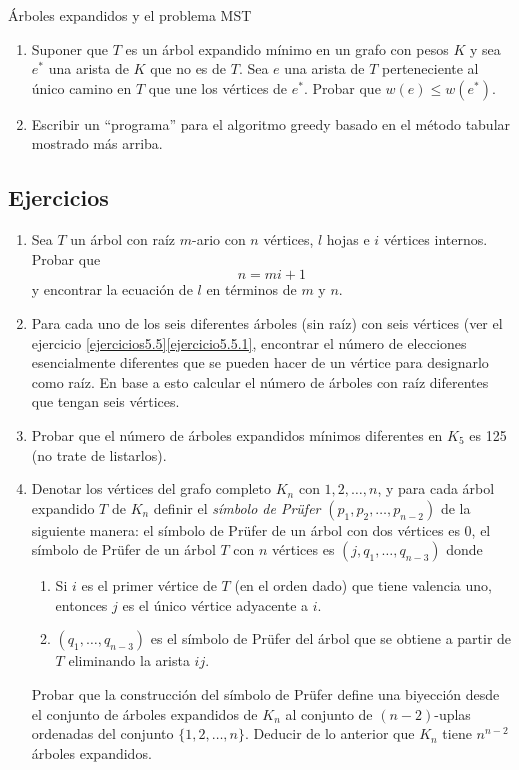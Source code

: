 \begin{section}{Árboles expandidos y el problema MST}
\begin{enumerate}
Encontrar todos los árboles expandidos mínimos para $G$.

\item Suponer que $T$ es un árbol expandido mínimo en un grafo con pesos $K$ y sea $e^*$ una arista de $K$ que no es de $T$. Sea $e$ una arista de $T$ perteneciente al único camino en $T$ que une los vértices de $e^*$. Probar que $w(e) \le w(e^*)$. 

\item Escribir un ``programa'' para el algoritmo greedy basado en el
método ta\-bu\-lar mostrado más arriba.
\end{enumerate}

\section{Ejercicios}
\begin{enumerate}
\item Sea $T$ un árbol con raíz $m$-ario con $n$ vértices, $l$ hojas e $i$ vértices internos. Probar que
$$ n=mi+1$$
y encontrar la ecuación de $l$ en términos de $m$ y $n$.

\item Para cada uno de los seis diferentes árboles (sin raíz) con seis vértices (ver el ejercicio \ref{ejercicios5.5}\ref{ejercicio5.5.1}, encontrar el número de elecciones esencialmente diferentes que se pueden hacer de un vértice para designarlo como raíz. En base a esto calcular el número de árboles con raíz diferentes que tengan seis vértices.

\item Probar que el número de árboles expandidos mínimos diferentes en $K_5$ es 125 (no trate de listarlos).

\item Denotar los vértices del grafo completo $K_n$ con $1, 2, \ldots,n$, y para cada árbol expandido $T$ de $K_n$ definir el \textit{símbolo de Prüfer} $(p_1,p_2,\ldots,p_{n-2})$ de la  siguiente manera: el símbolo de Prüfer de un árbol con dos vértices es $0$, el símbolo de Prüfer de un árbol $T$ con $n$ vértices es $(j,q_1,\ldots,q_{n-3})$ donde 
\begin{enumerate}
\item  Si $i$ es el primer vértice de $T$ (en el orden dado) que tiene valencia uno, entonces $j$ es el único vértice adyacente a $i$.
\item $(q_1,\ldots,q_{n-3})$ es el símbolo de Prüfer del árbol que se obtiene a partir de $T$ eliminando la arista $ij$.
\end{enumerate}
Probar que la construcción del símbolo de Prüfer define una biyección desde el conjunto de árboles expandidos de $K_n$ al conjunto de $(n-2)$-uplas ordenadas del conjunto $\{1,2,\ldots,n\}$. Deducir de lo anterior que $K_n$ tiene $n^{n-2}$ árboles expandidos.


\end{enumerate}
\end{section}

